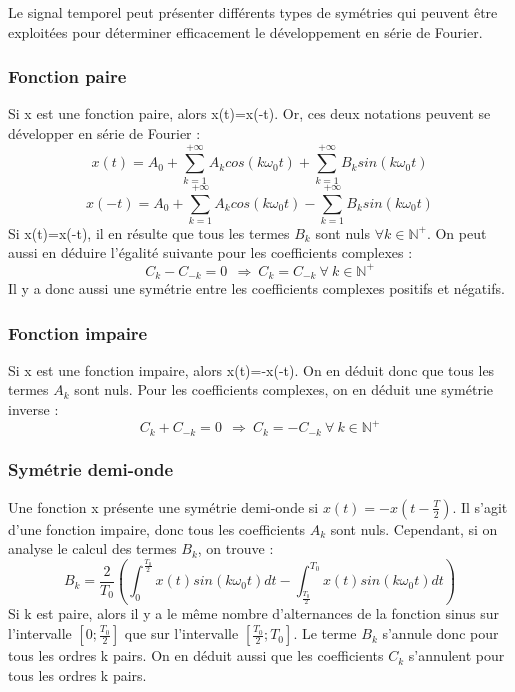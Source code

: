 	Le signal temporel peut présenter différents types de symétries qui peuvent être exploitées pour déterminer efficacement le développement en série de Fourier.
	
	\subsubsection{Fonction paire}
	Si x est une fonction paire, alors x(t)=x(-t). Or, ces deux notations peuvent se développer en série de Fourier :
	\begin{equation*}
	x(t)=A_0+\sum_{k=1}^{+\infty}A_{k}cos(k\omega_{0}t)+\sum_{k=1}^{+\infty}B_{k}sin(k\omega_{0}t)
	\end{equation*}
	\begin{equation*}
	x(-t)=A_0+\sum_{k=1}^{+\infty}A_{k}cos(k\omega_{0}t)-\sum_{k=1}^{+\infty}B_{k}sin(k\omega_{0}t)
	\end{equation*}
	Si x(t)=x(-t), il en résulte que tous les termes $B_k$ sont nuls $\forall k \in \mathbb{N^{+}}$. On peut aussi en déduire l'égalité suivante pour les coefficients complexes :
	\begin{equation*}
	C_k-C_{-k} = 0~~ \Rightarrow~C_k=C_{-k}~\forall~k \in \mathbb{N^{+}}
	\end{equation*}  
	Il y a donc aussi une symétrie entre les coefficients complexes positifs et négatifs.
	
	\subsubsection{Fonction impaire}
	Si x est une fonction impaire, alors x(t)=-x(-t). On en déduit donc que tous les termes $A_k$ sont nuls. Pour les coefficients complexes, on en déduit une symétrie inverse :
	\begin{equation*}
	C_k+C_{-k} = 0~~ \Rightarrow~C_k=-C_{-k}~\forall~k \in \mathbb{N^{+}}
	\end{equation*}
	
	\subsubsection{Symétrie demi-onde}
	Une fonction x présente une symétrie demi-onde si $x(t)=-x(t-\frac{T}{2})$. Il s'agit d'une fonction impaire, donc tous les coefficients $A_k$ sont nuls. Cependant, si on analyse le calcul des termes $B_k$, on trouve :
	\begin{equation*}
	B_k = \frac{2}{T_0}(\int_{0}^{\frac{T_0}{2}}x(t)sin(k\omega_{0}t)dt-\int_{\frac{T_0}{2}}^{T_0}x(t)sin(k\omega_{0}t)dt)
	\end{equation*}
	Si k est paire, alors il y a le même nombre d'alternances de la fonction sinus sur l'intervalle $[0;\frac{T_0}{2}]$ que sur l'intervalle $[\frac{T_0}{2};T_0]$. Le terme $B_k$ s'annule donc pour tous les ordres k pairs.
	On en déduit aussi que les coefficients $C_k$ s'annulent pour tous les ordres k pairs.\\
	 

